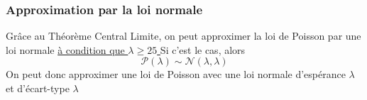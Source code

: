 \documentclass{article}
\begin{document}
\subsubsection{Approximation par la loi normale}
Grâce au Théorème Central Limite, on peut approximer la loi de Poisson par une loi normale \underline{à condition que $\lambda \geqslant 25$ }\newline Si c'est le cas, alors 
\begin{equation*}
    \mathcal{P}(\lambda) \sim \mathcal{N}(\lambda,\lambda)
\end{equation*}
On peut donc approximer une loi de Poisson avec une loi normale d'espérance $\lambda$ et d'écart-type $\lambda$
\end{document}
